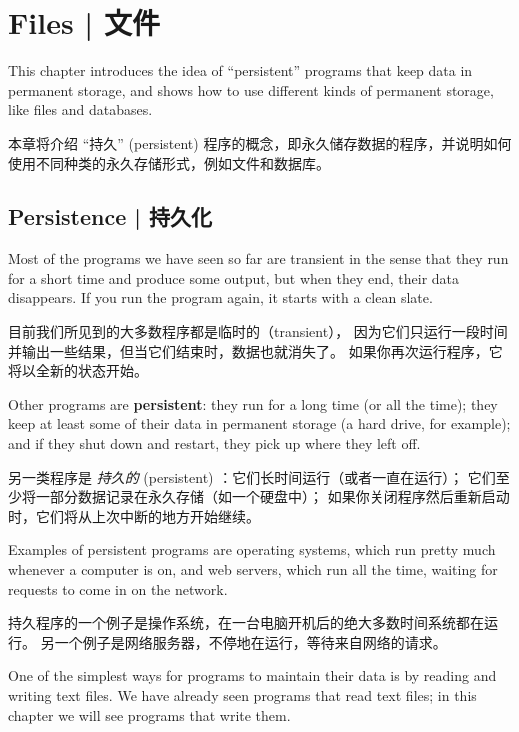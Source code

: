 

\chapter{Files  |  文件}

This chapter introduces the idea of ``persistent'' programs that
keep data in permanent storage, and shows how to use different
kinds of permanent storage, like files and databases.

本章将介绍 ``持久'' (persistent) 程序的概念，即永久储存数据的程序，并说明如何使用不同种类的永久存储形式，例如文件和数据库。

\section{Persistence  |  持久化}

    

Most of the programs we have seen so far are transient in the
sense that they run for a short time and produce some output,
but when they end, their data disappears.  If you run the program
again, it starts with a clean slate.

目前我们所见到的大多数程序都是临时的（transient），
因为它们只运行一段时间并输出一些结果，但当它们结束时，数据也就消失了。
如果你再次运行程序，它将以全新的状态开始。

Other programs are {\bf persistent}: they run for a long time
(or all the time); they keep at least some of their data
in permanent storage (a hard drive, for example); and
if they shut down and restart, they pick up where they left off.

另一类程序是 {\em 持久的} (persistent) ：它们长时间运行（或者一直在运行）；
它们至少将一部分数据记录在永久存储（如一个硬盘中）；
如果你关闭程序然后重新启动时，它们将从上次中断的地方开始继续。

Examples of persistent programs are operating systems, which
run pretty much whenever a computer is on, and web servers,
which run all the time, waiting for requests to come in on
the network.

持久程序的一个例子是操作系统，在一台电脑开机后的绝大多数时间系统都在运行。
另一个例子是网络服务器，不停地在运行，等待来自网络的请求。

One of the simplest ways for programs to maintain their data
is by reading and writing text files.  We have already seen
programs that read text files; in this chapter we will see programs
that write them.

